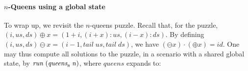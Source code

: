 \documentclass{llncs}
\newcommand{\Varid}[1]{\mathit{#1}}
\let\Varid\mathit
\begin{document}
\paragraph{\ensuremath{\Varid{n}}-Queens using a global state}
To wrap up, we revisit the \ensuremath{\Varid{n}}-queens puzzle.
Recall that, for the puzzle, \ensuremath{(\Varid{i},\Varid{us},\Varid{ds})\mathbin{\oplus}\Varid{x}\mathrel{=}(\mathrm{1}\mathbin{+}\Varid{i},(\Varid{i}\mathbin{+}\Varid{x})\mathbin{:}\Varid{us},(\Varid{i}\mathbin{-}\Varid{x})\mathbin{:}\Varid{ds})}.
By defining \ensuremath{(\Varid{i},\Varid{us},\Varid{ds})\mathbin{\ominus}\Varid{x}\mathrel{=}(\Varid{i}\mathbin{-}\mathrm{1},\Varid{tail}\;\Varid{us},\Varid{tail}\;\Varid{ds})},
we have \ensuremath{(\mathbin{\ominus}\Varid{x})\mathbin{\cdot}(\mathbin{\oplus}\Varid{x})\mathrel{=}\Varid{id}}.
One may thus compute all solutions to the puzzle,
in a scenario with a shared global state, by \ensuremath{\Varid{run}\;(\Varid{queens}_{\scaleobj{0.7}{\sf R}}\;\Varid{n})},
where \ensuremath{\Varid{queens}} expands to:
\end{document}
